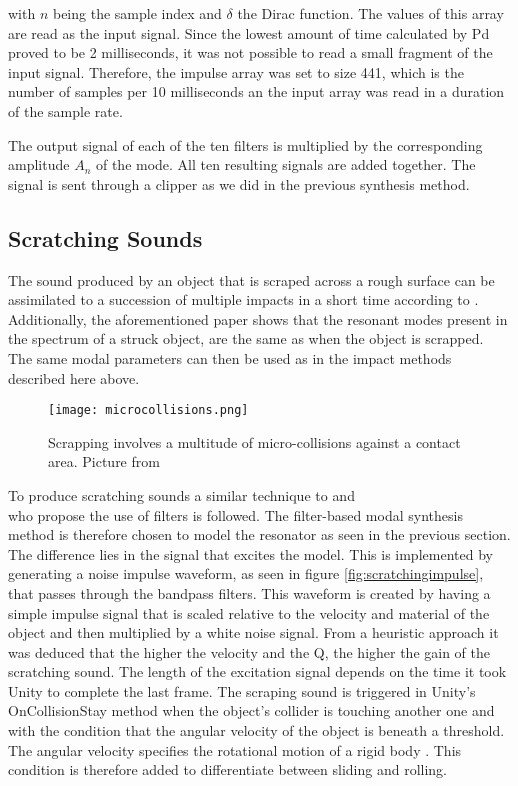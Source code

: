 with $n$ being the sample index and $\delta$ the Dirac function. The values of this array are read as the input signal. Since the lowest amount of time calculated by \gls{Pd} proved to be 2 milliseconds, it was not possible to read a small fragment of the input signal. Therefore, the impulse array was set to size 441, which is the number of samples per 10 milliseconds an the input array was read in a duration of the sample rate.

The output signal of each of the ten filters is multiplied by the corresponding amplitude $A_n$ of the mode. All ten resulting signals are added together. The signal is sent through a clipper as we did in the previous synthesis method.

\subsection{Scratching Sounds}\label{sec:scratching_synth}

The sound produced by an object that is scraped across a rough surface can be assimilated to a succession of multiple impacts in a short time according to \cite{gaver1993we}. Additionally, the aforementioned paper shows that the resonant modes present in the spectrum of a struck object, are the same as when the object is scrapped. The same modal parameters can then be used as in the impact methods described here above.

\begin{figure}[H]
  \centering
    \texttt{[image: microcollisions.png]}
      \caption{Scrapping involves a multitude of micro-collisions against a contact area. Picture from \cite{gaver1993we}}
      \label{fig:microcollisions}
\end{figure}

To produce scratching sounds a similar technique to \cite{gaver1993we} and \\ \cite{van2001foleyautomatic} who propose the use of filters is followed. The filter-based modal synthesis method is therefore chosen to model the resonator as seen in the previous section. The difference lies in the signal that excites the model. This is implemented by generating a noise impulse waveform, as seen in figure \ref{fig:scratchingimpulse}, that passes through the bandpass filters. This waveform is created by having a simple impulse signal that is scaled relative to the velocity and material of the object and then multiplied by a white noise signal. From a heuristic approach it was deduced that the higher the velocity and the \gls{Q}, the higher the gain of the scratching sound. The length of the excitation signal depends on the time it took Unity\textsuperscript{\textregistered} to complete the last frame. The scraping sound is triggered in Unity\textsuperscript{\textregistered}'s OnCollisionStay method when the object's collider is touching another one and with the condition that the angular velocity of the object is beneath a threshold. The angular velocity specifies the rotational motion of a rigid body \cite{sears1964university}. This condition is therefore added to differentiate between sliding and rolling.

